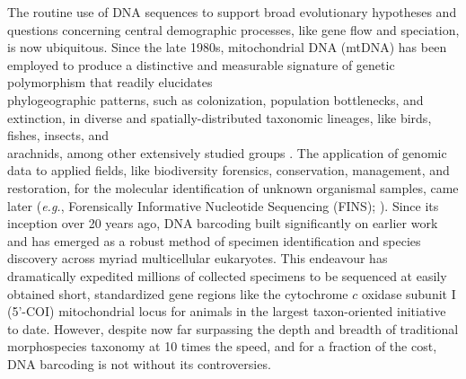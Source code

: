 \documentclass[12pt]{article}
\begin{document}
The routine use of DNA sequences to support broad evolutionary hypotheses and \\ questions concerning central demographic processes, like gene flow and speciation, is now ubiquitous. Since the late 1980s, mitochondrial DNA (mtDNA) has been employed to produce a distinctive and measurable signature of genetic polymorphism that readily elucidates \\ phylogeographic patterns, such as colonization, population bottlenecks, and extinction, in diverse and spatially-distributed  taxonomic lineages, like birds, fishes, insects, and \\ arachnids, among other extensively studied groups \citep{avise1987intraspecific}. The application of genomic data to applied fields, like biodiversity forensics, conservation, management, and restoration, for the molecular identification of unknown organismal samples, came later (\textit{e.g.}, Forensically Informative Nucleotide Sequencing (FINS); \citet{bartlett1992fins}). Since its inception over 20 years ago, DNA barcoding \citep{hebert2003biological} built significantly on earlier work and has emerged as a robust method of specimen identification and species discovery across myriad multicellular eukaryotes. This endeavour has dramatically expedited millions of collected specimens to be sequenced at easily obtained short, standardized gene regions like the cytochrome $c$ oxidase subunit I (5'-COI) mitochondrial locus for animals \citep{hebert2003barcoding} in the largest taxon-oriented initiative to date. However, despite now far surpassing the depth and breadth of traditional morphospecies taxonomy at 10 times the speed, and for a fraction of the cost, DNA barcoding is not without its controversies.
\end{document}
